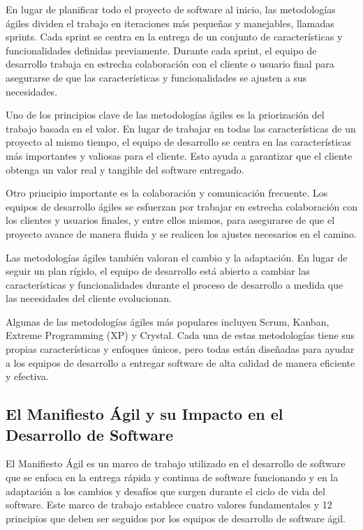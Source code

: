 \documentclass[executivepaper]{article}
\begin{document}
En lugar de planificar todo el proyecto de software al inicio, las metodologías ágiles dividen el trabajo en iteraciones más pequeñas y manejables, llamadas sprints. Cada sprint se centra en la entrega de un conjunto de características y funcionalidades definidas previamente. Durante cada sprint, el equipo de desarrollo trabaja en estrecha colaboración con el cliente o usuario final para asegurarse de que las características y funcionalidades se ajusten a sus necesidades.

Uno de los principios clave de las metodologías ágiles es la priorización del trabajo basada en el valor. En lugar de trabajar en todas las características de un proyecto al mismo tiempo, el equipo de desarrollo se centra en las características más importantes y valiosas para el cliente. Esto ayuda a garantizar que el cliente obtenga un valor real y tangible del software entregado.

Otro principio importante es la colaboración y comunicación frecuente. Los equipos de desarrollo ágiles se esfuerzan por trabajar en estrecha colaboración con los clientes y usuarios finales, y entre ellos mismos, para asegurarse de que el proyecto avance de manera fluida y se realicen los ajustes necesarios en el camino.

Las metodologías ágiles también valoran el cambio y la adaptación. En lugar de seguir un plan rígido, el equipo de desarrollo está abierto a cambiar las características y funcionalidades durante el proceso de desarrollo a medida que las necesidades del cliente evolucionan.

Algunas de las metodologías ágiles más populares incluyen Scrum, Kanban, Extreme Programming (XP) y Crystal. Cada una de estas metodologías tiene sus propias características y enfoques únicos, pero todas están diseñadas para ayudar a los equipos de desarrollo a entregar software de alta calidad de manera eficiente y efectiva.

\newpage
\subsection{El Manifiesto Ágil y su Impacto en el Desarrollo de Software}

El Manifiesto Ágil es un marco de trabajo utilizado en el desarrollo de software que se enfoca en la entrega rápida y continua de software funcionando y en la adaptación a los cambios y desafíos que surgen durante el ciclo de vida del software. Este marco de trabajo establece cuatro valores fundamentales y 12 principios que deben ser seguidos por los equipos de desarrollo de software ágil.
\end{document}
